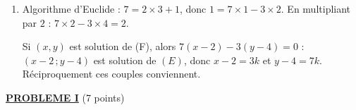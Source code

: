 \begin{description}
\begin{enumerate}
\begin{enumerate}
				$7x = 3y$, donc $3$ divise $7x$ ; comme $\pgcd{3}{7} = 1$, $3$ divise $x$ (Gauss) : $x = 3k$, $k \in \mathbb{Z}$, puis $7 \times 3k = 3y$, d'où $y = 7k$.
				Réciproquement $7(3k) - 3(7k) = 0$.
				\par\noindent{}
			\item {}
				Algorithme d'Euclide : $7 = 2 \times 3 + 1$, donc $1 = 7 \times 1 - 3 \times 2$. En multipliant par $2$ : $7 \times 2 - 3 \times 4 = 2$.
				\par\noindent{}
				Si $(x,y)$ est solution de (F), alors $7(x - 2) - 3(y - 4) = 0$ : $(x - 2 \, ; y - 4)$ est solution de $(E)$, donc $x - 2 = 3k$ et $y - 4 = 7k$.
				Réciproquement ces couples conviennent.
				\par\noindent{}
		\end{enumerate}
	\end{enumerate}
\end{description}
\noindent \underline{\textsc{\textbf{PROBLEME I}}} (7 points)
